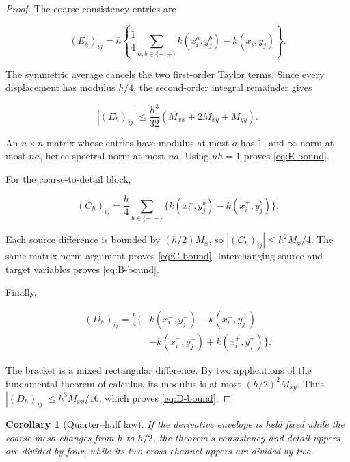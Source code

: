 \documentclass[11pt]{article}
\newtheorem{corollary}[theorem]{Corollary}
\theoremstyle{definition}
\theoremstyle{remark}
\begin{document}
\begin{proof}
The coarse-consistency entries are

\begin{equation}
(E_h)_{ij}=h\left\{
\frac14\sum_{a,b\in\{-,+\}}k(x_i^a,y_j^b)-k(x_i,y_j)
\right\}.
\label{eq:E-entry}
\end{equation}

The symmetric average cancels the two first-order Taylor terms.  Since every
displacement has modulus $h/4$, the second-order integral remainder gives

\[
|(E_h)_{ij}|\le
\frac{h^3}{32}(M_{xx}+2M_{xy}+M_{yy}).
\]

An $n\times n$ matrix whose entries have modulus at most $a$ has
$1$- and $\infty$-norm at most $na$, hence spectral norm at most $na$.
Using $nh=1$ proves \eqref{eq:E-bound}.

For the coarse-to-detail block,

\begin{equation}
(C_h)_{ij}=\frac h4\sum_{b\in\{-,+\}}
\{k(x_i^-,y_j^b)-k(x_i^+,y_j^b)\}.
\label{eq:C-entry}
\end{equation}

Each source difference is bounded by $(h/2)M_x$, so
$|(C_h)_{ij}|\le h^2M_x/4$.  The same matrix-norm argument proves
\eqref{eq:C-bound}.  Interchanging source and target variables proves
\eqref{eq:B-bound}.

Finally,

\begin{equation}
\begin{split}
(D_h)_{ij}=\frac h4\{&k(x_i^-,y_j^-)-k(x_i^-,y_j^+)\\
&-k(x_i^+,y_j^-)+k(x_i^+,y_j^+)\}.
\end{split}
\label{eq:D-entry}
\end{equation}

The bracket is a mixed rectangular difference.  By two applications of the
fundamental theorem of calculus, its modulus is at most
$(h/2)^2M_{xy}$.  Thus $|(D_h)_{ij}|\le h^3M_{xy}/16$, which proves
\eqref{eq:D-bound}.
\end{proof}

\begin{corollary}[Quarter--half law]
\label{cor:quarter-half}
If the derivative envelope is held fixed while the coarse mesh changes from
$h$ to $h/2$, the theorem's consistency and detail uppers are divided by four,
while its two cross-channel uppers are divided by two.
\end{corollary}
\end{document}
